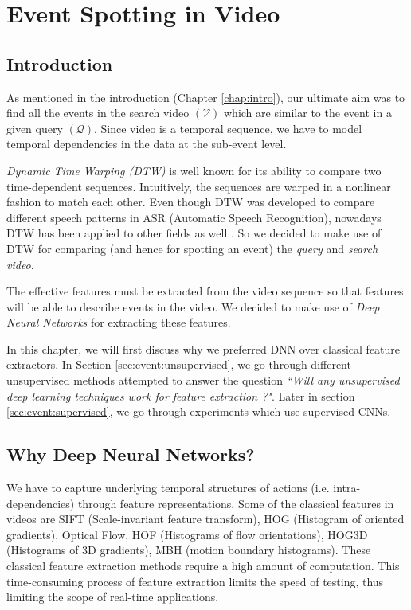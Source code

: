 \chapter{Event Spotting in Video}
\label{chap:event}

\section{Introduction}
As mentioned in the introduction (Chapter \ref{chap:intro}), our ultimate aim was to find all the events in the search video $(\mathcal{V})$ which are similar to the event in a given query $(\mathcal{Q})$.  Since video is a temporal sequence, we have to model temporal dependencies in the data at the sub-event level.

\textit{Dynamic Time Warping (DTW)} is well known for its ability to compare two time-dependent sequences.  Intuitively, the sequences are warped in a nonlinear fashion to match each other.  Even though DTW was developed to compare different speech patterns in ASR (Automatic Speech Recognition), nowadays DTW has been applied to other fields as well \cite{muller2007information}.  So we decided to make use of DTW for comparing (and hence for spotting an event) the \textit{query} and \textit{search video}.

The effective features must be extracted from the video sequence so that features will be able to describe events in the video.  We decided to make use of \textit{Deep Neural Networks} for extracting these features.

In this chapter, we will first discuss why we preferred  DNN over classical feature extractors.  In Section \ref{sec:event:unsupervised}, we go through different unsupervised methods attempted to answer the question \textit{``Will any unsupervised deep learning techniques work for feature extraction ?"}.  Later in section \ref{sec:event:supervised}, we go through experiments which use supervised CNNs.  

\section{Why Deep Neural Networks?}
\label{sec:event:why}
We have to capture underlying temporal structures of actions (i.e.  intra-dependencies) through feature representations.  Some of the classical features in videos are SIFT (Scale-invariant feature transform), HOG (Histogram of oriented gradients), Optical Flow, HOF (Histograms of flow orientations), HOG3D (Histograms of 3D gradients), MBH (motion boundary histograms).  These classical feature extraction methods require a high amount of computation\cite{baker2011database,chatfield2011devil}.  This time-consuming process of feature extraction limits the speed of testing, thus limiting the scope of real-time applications.

